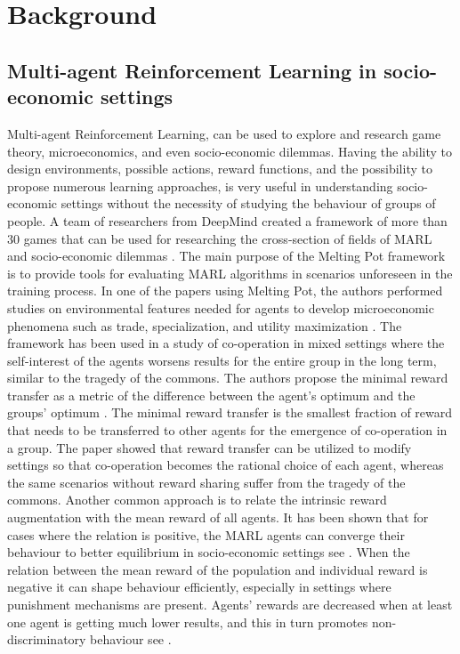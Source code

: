 \documentclass[pdflatex,sn-basic,lineno]{sn-jnl}
\theoremstyle{thmstyleone}%
\theoremstyle{thmstyletwo}%
\theoremstyle{thmstylethree}%
\begin{document}

\section{Background}\label{sec2}

\subsection{Multi-agent Reinforcement Learning in socio-economic settings}\label{subsec2-1}

Multi-agent Reinforcement Learning, can be used to explore and research game theory, microeconomics, and even
socio-economic dilemmas. Having the ability to design environments, possible actions, reward functions, and the
possibility to propose numerous learning approaches, is very useful in understanding socio-economic settings without the
necessity of studying the behaviour of groups of people. A team of researchers from DeepMind created a framework of more
than 30 games that can be used for researching the cross-section of fields of MARL and socio-economic dilemmas
\citep{Leibo2021, agapiou2023meltingpot20}. The main purpose of the Melting Pot framework is to provide tools for
evaluating MARL algorithms in scenarios unforeseen in the training process. In one of the papers using Melting Pot, the
authors performed studies on environmental features needed for agents to develop microeconomic phenomena such as trade,
specialization, and utility maximization \citep{Johanson2022}. The framework has been used in a study of co-operation in
mixed settings where the self-interest of the agents worsens results for the entire group in the long term, similar to
the tragedy of the commons. The authors propose the minimal reward transfer as a metric of the difference between the
agent’s optimum and the groups’ optimum \citep{Willis2023a}. The minimal reward transfer is the smallest
fraction of reward that needs to be transferred to other agents for the emergence of co-operation in a group. The paper
showed that reward transfer can be utilized to modify settings so that co-operation becomes the rational choice of each
agent, whereas the same scenarios without reward sharing suffer from the tragedy of the commons. Another common approach
is to relate the intrinsic reward augmentation with the mean reward of all agents. It has been shown that for cases
where the relation is positive, the MARL agents can converge their behaviour to better equilibrium in socio-economic
settings see \citep{Peysakhovich2017}. When the relation between the mean reward of the population and individual reward
is negative it can shape behaviour efficiently, especially in settings where punishment mechanisms are present. Agents’
rewards are decreased when at least one agent is getting much lower results, and this in turn promotes
non-discriminatory behaviour see \cite{Hughes2018}.
\end{document}

